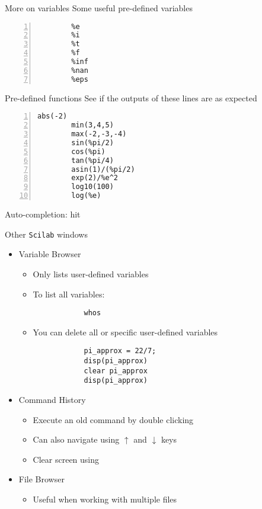 \documentclass[%
    10pt,
    xcolor={dvipsnames},
    handout,
]{beamer}
\newcommand{\inlinecode}[1]{\inlinecodebox{#1}} %
\newcommand{\keyword}[1]{#1}
\newcommand{\scilab}{\texttt{Scilab}}
\begin{document}
\begin{frame}[fragile]{More on variables}
    Some useful pre-defined variables
    \begin{lstlisting}[numbers=left]
        %pi
        %e
        %i
        %t
        %f
        %inf
        %nan
        %eps
    \end{lstlisting}
\end{frame}

\begin{frame}[fragile]{Pre-defined functions}
    See if the outputs of these lines are as expected
    \begin{lstlisting}[numbers=left]
        abs(-2)
        min(3,4,5)
        max(-2,-3,-4)
        sin(%pi/2)
        cos(%pi)
        tan(%pi/4)
        asin(1)/(%pi/2)
        exp(2)/%e^2
        log10(100)
        log(%e)
    \end{lstlisting}
    Auto-completion: hit 
\end{frame}

\begin{frame}[fragile]{Other \scilab{} windows}
\begin{itemize}
    \item \keyword{Variable Browser}
    \begin{itemize}
        \item Only lists user-defined variables
        \item To list all variables:
        \begin{lstlisting}
            whos
        \end{lstlisting}
        \item You can delete all or specific user-defined variables
        \begin{lstlisting}
            pi_approx = 22/7;
            disp(pi_approx)
            clear pi_approx
            disp(pi_approx)
        \end{lstlisting}
    \end{itemize}
    \item \keyword{Command History}
    \begin{itemize}
        \item Execute an old command by double clicking
        \item Can also navigate using $\uparrow$ and $\downarrow$ keys
        \item Clear screen using \inlinecode{clc}
    \end{itemize}
    \item \keyword{File Browser}
    \begin{itemize}
        \item Useful when working with multiple files
    \end{itemize}
\end{itemize}
\end{frame}
\end{document}
